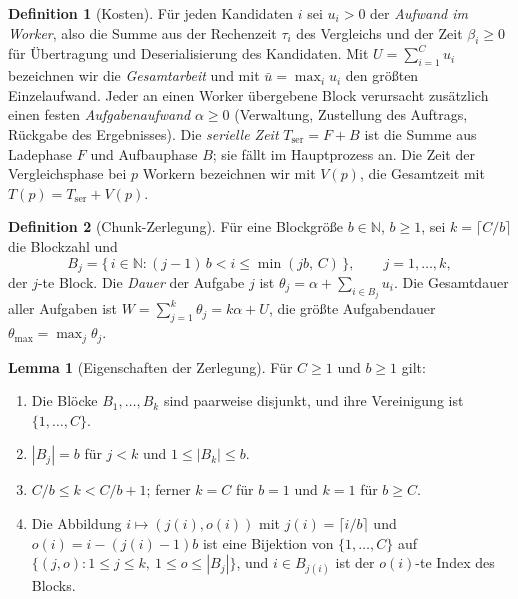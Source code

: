 \documentclass[a4paper,12pt, twoside]{report}
\theoremstyle{definition}
\newtheorem{definition}{Definition}
\newtheorem{lemma}{Lemma}
\begin{document}
\begin{definition}[Kosten]
\label{def:p910_kosten}
Für jeden Kandidaten $i$ sei $u_i>0$ der \emph{Aufwand im Worker}, also die Summe aus der Rechenzeit $\tau_i$ des Vergleichs und der Zeit $\beta_i\ge 0$ für Übertragung und Deserialisierung des Kandidaten. Mit $U=\sum_{i=1}^C u_i$ bezeichnen wir die \emph{Gesamtarbeit} und mit $\bar u=\max_i u_i$ den größten Einzelaufwand. Jeder an einen Worker übergebene Block verursacht zusätzlich einen festen \emph{Aufgabenaufwand} $\alpha\ge 0$ (Verwaltung, Zustellung des Auftrags, Rückgabe des Ergebnisses). Die \emph{serielle Zeit} $T_{\mathrm{ser}}=F+B$ ist die Summe aus Ladephase $F$ und Aufbauphase $B$; sie fällt im Hauptprozess an. Die Zeit der Vergleichsphase bei $p$ Workern bezeichnen wir mit $V(p)$, die Gesamtzeit mit $T(p)=T_{\mathrm{ser}}+V(p)$.
\end{definition}

\begin{definition}[Chunk-Zerlegung]
\label{def:p910_chunk}
Für eine Blockgröße $b\in\mathbb N$, $b\ge 1$, sei $k=\lceil C/b\rceil$ die Blockzahl und
\[
B_j=\{\,i\in\mathbb N : (j-1)\,b<i\le\min(jb,\,C)\,\},\qquad j=1,\dots,k,
\]
der $j$-te Block. Die \emph{Dauer} der Aufgabe $j$ ist $\theta_j=\alpha+\sum_{i\in B_j}u_i$. Die Gesamtdauer aller Aufgaben ist $W=\sum_{j=1}^k\theta_j=k\alpha+U$, die größte Aufgabendauer $\theta_{\max}=\max_j\theta_j$.
\end{definition}

\begin{lemma}[Eigenschaften der Zerlegung]
\label{lem:p910_zerlegung}
Für $C\ge 1$ und $b\ge 1$ gilt:
\begin{enumerate}[label=(\alph*)]
\item Die Blöcke $B_1,\dots,B_k$ sind paarweise disjunkt, und ihre Vereinigung ist $\{1,\dots,C\}$.
\item $|B_j|=b$ für $j<k$ und $1\le|B_k|\le b$.
\item $C/b\le k<C/b+1$; ferner $k=C$ für $b=1$ und $k=1$ für $b\ge C$.
\item Die Abbildung $i\mapsto(j(i),o(i))$ mit $j(i)=\lceil i/b\rceil$ und $o(i)=i-(j(i)-1)b$ ist eine Bijektion von $\{1,\dots,C\}$ auf $\{(j,o):1\le j\le k,\ 1\le o\le|B_j|\}$, und $i\in B_{j(i)}$ ist der $o(i)$-te Index des Blocks.
\end{enumerate}
\end{lemma}
\end{document}
